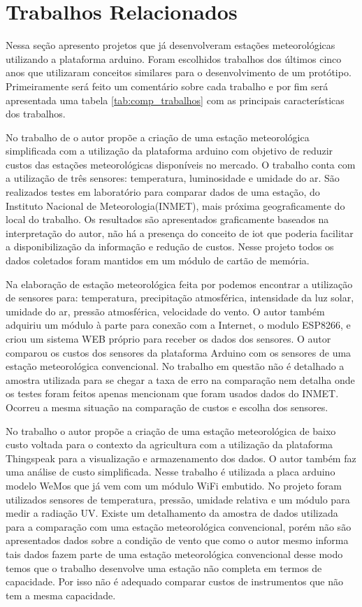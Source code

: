 \section{Trabalhos Relacionados}

Nessa seção apresento projetos que já desenvolveram estações meteorológicas utilizando a plataforma arduino. Foram escolhidos trabalhos dos últimos cinco anos que utilizaram conceitos similares para o desenvolvimento de um protótipo. Primeiramente será feito um comentário sobre cada trabalho e por fim será apresentada uma tabela \ref{tab:comp_trabalhos} com as principais características dos trabalhos.

No trabalho de \cite{torres2015aquisiccao} o autor propõe a criação de uma estação meteorológica simplificada com a utilização da plataforma arduino com objetivo de reduzir custos das estações meteorológicas disponíveis no mercado. O trabalho conta com a utilização de três sensores: temperatura, luminosidade e umidade do ar. São realizados testes em laboratório para comparar dados de uma estação, do Instituto Nacional de Meteorologia(INMET), mais próxima geograficamente do local do trabalho. Os resultados são apresentados graficamente baseados na interpretação do autor, não há a presença do conceito de iot que poderia facilitar a disponibilização da informação e redução de custos. Nesse projeto todos os dados coletados foram mantidos em um módulo de cartão de memória.

Na elaboração de estação meteorológica feita por \cite{da2016estaccao} podemos encontrar a utilização de sensores para: temperatura, precipitação atmosférica, intensidade da luz solar, umidade do ar, pressão atmosférica, velocidade do vento. O autor também adquiriu um módulo à parte para conexão com a Internet, o modulo ESP8266, e criou um sistema WEB próprio para receber os dados dos sensores. O autor comparou os custos dos sensores da plataforma Arduino com os sensores de uma estação meteorológica convencional. No trabalho em questão não é detalhado a amostra utilizada para se chegar a taxa de erro na comparação nem detalha onde os testes foram feitos apenas mencionam que foram usados dados do INMET. Ocorreu a mesma situação na comparação de custos e escolha dos sensores.

No trabalho \cite{deestaccao} o autor propõe a criação de uma estação meteorológica de baixo custo voltada para o contexto da agricultura com a utilização da plataforma Thingspeak para a visualização e armazenamento dos dados. O autor também faz uma análise de custo simplificada. Nesse trabalho é utilizada a placa arduino modelo WeMos que já vem com um módulo WiFi embutido. No projeto foram utilizados sensores de temperatura, pressão, umidade relativa e um módulo para medir a radiação UV. Existe um detalhamento da amostra de dados utilizada para a comparação com uma estação meteorológica convencional, porém não são apresentados dados sobre a condição de vento que como o autor mesmo informa tais dados fazem parte de uma estação meteorológica convencional desse modo temos que o trabalho desenvolve uma estação não completa em termos de capacidade. Por isso não é adequado comparar custos de instrumentos que não tem a mesma capacidade.  

